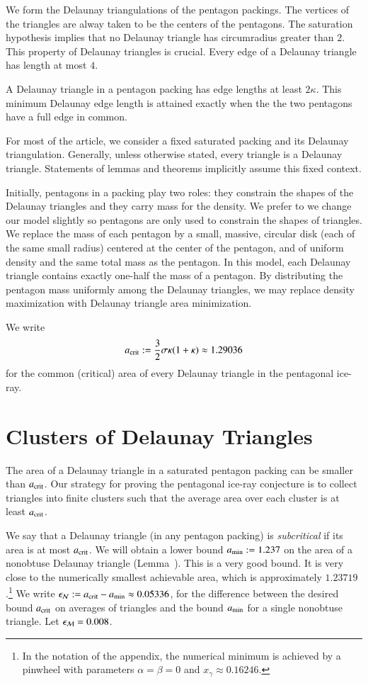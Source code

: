 We form the Delaunay triangulations of the pentagon packings.  The
vertices of the triangles are alway taken to be the centers of the
pentagons.  The saturation hypothesis implies that no Delaunay
triangle has circumradius greater than $2$.  This property of Delaunay
triangles is crucial.   Every edge of a Delaunay
triangle has length at most $4$.

A Delaunay triangle in a pentagon packing has edge lengths at least
$2\kappa$.  This minimum Delaunay edge length is attained exactly when
the the two pentagons have a full edge in common.

For most of the article, we consider a fixed saturated packing and its
Delaunay triangulation.  Generally, unless otherwise stated,
every triangle is a  Delaunay triangle.
Statements of lemmas and theorems implicitly
assume this fixed context.

Initially, pentagons in a packing play two roles: they constrain the
shapes of the Delaunay triangles and they carry mass for the density.
We prefer to we change our model slightly so pentagons are only used
to constrain the shapes of triangles.  We replace the mass of each
pentagon by a small, massive, circular disk (each of the same small
radius) centered at the center of the pentagon, and of uniform density
and the same total mass as the pentagon.  In this model, each Delaunay
triangle contains exactly one-half the mass of a pentagon.  By
distributing the pentagon mass uniformly among the Delaunay triangles,
we may replace density maximization with Delaunay triangle area
minimization.

We write 
\[
a_\text{crit} := \frac{3}{2}{ \sigma \kappa(1+\kappa)} \approx 1.29036
\] %
for the common (critical) area of every Delaunay triangle in the 
pentagonal ice-ray.

\section{Clusters of Delaunay Triangles}

The area of a Delaunay triangle in a saturated pentagon packing can be
smaller than $a_\text{crit}$.  Our strategy for proving the pentagonal
ice-ray conjecture is to collect triangles into finite clusters such
that the average area over each cluster is at least $a_\text{crit}$.

We say that a Delaunay triangle (in any pentagon packing) is {\it
  subcritical} if its area is at most $a_\text{crit}$.  We will obtain a
lower bound $a_\text{min} := 1.237$ on the area of a nonobtuse Delaunay
triangle (Lemma~).  This is a very good bound.  It is
very close to the numerically smallest achievable area, which is
approximately $1.23719$.\footnote{In the notation of the appendix, the
  numerical minimum is achieved by a pinwheel with parameters
  $\alpha=\beta=0$ and $x_\gamma\approx 0.16246$.}  We write $\epsilon_{\mathcal N} :=
a_\text{crit} - a_\text{min} \approx 0.05336$, for the difference between the desired
bound $a_\text{crit}$ on averages of triangles and the bound $a_\text{min}$ for a
single nonobtuse triangle.  Let $\epsilon_{\mathcal M} = 0.008$.

